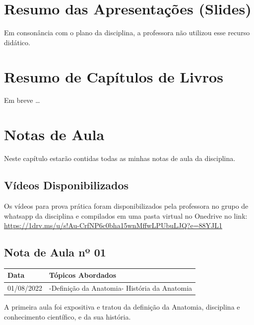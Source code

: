 \documentclass[
]{book}
\begin{document}
\hypertarget{resumo-das-apresentauxe7uxf5es-slides}{%
\chapter{Resumo das Apresentações (Slides)}\label{resumo-das-apresentauxe7uxf5es-slides}}

Em consonância com o plano da disciplina, a professora não utilizou esse recurso didático.

\hypertarget{resumo-de-capuxedtulos-de-livros}{%
\chapter{Resumo de Capítulos de Livros}\label{resumo-de-capuxedtulos-de-livros}}

Em breve \ldots{}

\hypertarget{notas-de-aula}{%
\chapter{Notas de Aula}\label{notas-de-aula}}

Neste capítulo estarão contidas todas as minhas notas de aula da disciplina.

\hypertarget{vuxeddeos-disponibilizados}{%
\section{Vídeos Disponibilizados}\label{vuxeddeos-disponibilizados}}

Os vídeos para prova prática foram disponibilizados pela professora no grupo de whatsapp da disciplina e compilados em uma pasta virtual no Onedrive no link: \url{https://1drv.ms/u/s!Au-CrfNP6c0bha15wnMffwLPUbuLJQ?e=88YJL1}

\hypertarget{nota-de-aula-nuxba-01}{%
\section{Nota de Aula nº 01}\label{nota-de-aula-nuxba-01}}

\begin{longtable}[]{@{}ll@{}}
\toprule()
Data & Tópicos Abordados \\
\midrule()
\endhead
01/08/2022 & -Definição da Anatomia- História da Anatomia \\
\bottomrule()
\end{longtable}

A primeira aula foi expositiva e tratou da definição da Anatomia, disciplina e conhecimento científico, e da sua história.
\end{document}
